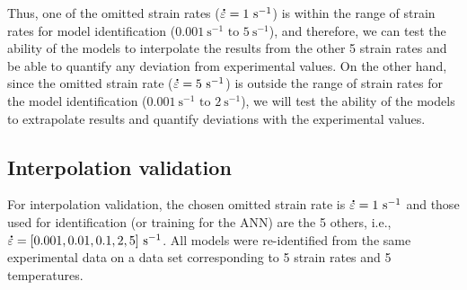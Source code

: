 \documentclass[twoside,english,1p,final,sort&compress]{elsarticle}
\makeatletter
\theoremstyle{plain}
\DeclareRobustCommand{\mdot}[1]{\accentset{\mbox{\bfseries .}}{#1}}
\DeclareRobustCommand{\ie}{i.e.\@\xspace}
\DeclareRobustCommand{\ps}{\text{s}^{-1}}
\makeatother
\begin{document}
Thus, one of the omitted strain rates ($\mdot\varepsilon=1~\ps$) is within the range of strain rates for model identification ($0.001~\ps\text{ to }5~\ps$), and therefore, we can test the ability of the models to interpolate the results from the other 5 strain rates and be able to quantify any deviation from experimental values.
On the other hand, since the omitted strain rate ($\mdot\varepsilon=5~\ps$) is outside the range of strain rates for the model identification ($0.001~\ps\text{ to }2~\ps$), we will test the ability of the models to extrapolate results and quantify deviations with the experimental values.

\subsection{Interpolation validation}

For interpolation validation, the chosen omitted strain rate is $\mdot\varepsilon=1~\ps$ and those used for identification (or training for the ANN) are the 5 others, \ie, $\mdot\varepsilon=[0.001, 0.01, 0.1, 2, 5]~\ps$.
All models were re-identified from the same experimental data on a data set corresponding to 5 strain rates and 5 temperatures.
\end{document}
